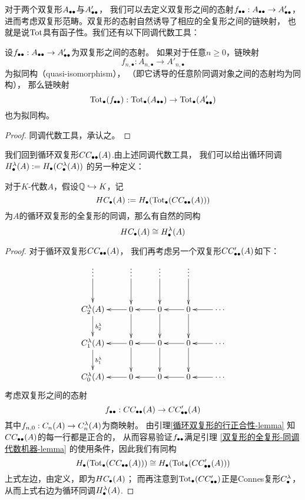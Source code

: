 对于两个双复形$A_{\bullet\bullet}$与$A'_{\bullet\bullet}$，
我们可以去定义双复形之间的态射$f_{\bullet\bullet}:A_{\bullet\bullet}\to A'_{\bullet\bullet}$，
进而考虑双复形范畴。双复形的态射自然诱导了相应的全复形之间的链映射，
也就是说$\operatorname{Tot}$具有函子性。我们还有以下同调代数工具：

\begin{lemma}设$f_{\bullet\bullet}:A_{\bullet\bullet}\to A'_{\bullet\bullet}$为双复形之间的态射。
如果对于任意$n\geq 0$，链映射
$$f_{n,\bullet}:A_{n,\bullet}\to A'_{n,\bullet}$$
为拟同构（quasi-isomorphism），
（即它诱导的任意阶同调对象之间的态射均为同构），
那么链映射
$$\operatorname{Tot}_{\bullet}(f_{\bullet\bullet}):
\operatorname{Tot}_{\bullet}(A_{\bullet\bullet})\to\operatorname{Tot}_{\bullet}(A'_{\bullet\bullet})$$
也为拟同构。
\label{双复形的全复形-同调代数机器-lemma}
\end{lemma}

\begin{proof}
同调代数工具，承认之。
\end{proof}

我们回到循环双复形$CC_{\bullet\bullet}(A)$.由上述同调代数工具，
我们可以给出循环同调
$H^{\lambda}_{\bullet}(A):=H_{\bullet}(C^{\lambda}_{\bullet}(A))$
的另一种定义：

\begin{thm}对于$K$-代数$A$，假设$\mathbb{Q}\hookrightarrow K$，记
$$HC_{\bullet}(A):=H_{\bullet}(\operatorname{Tot}_{\bullet}(CC_{\bullet\bullet}(A)))$$
为$A$的循环双复形的全复形的同调，那么有自然的同构
$$HC_{\bullet}(A)\cong H^{\lambda}_{\bullet}(A)$$
\end{thm}

\begin{proof}
对于循环双复形$CC_{\bullet\bullet}(A)$，
我们再考虑另一个双复形$CC'_{\bullet\bullet}(A)$如下：
$$\xymatrix{
   \vdots \ar[d]
  &\vdots \ar[d]
  &\vdots \ar[d]
  &\vdots \ar[d]
  &
\\
   C_2^{\lmd}(A)  \ar[d]^{b_2^{\lmd}}
  &0 \ar[d]  \ar[l]
  &0 \ar[d]  \ar[l]
  &0 \ar[d]  \ar[l]
  &\cdots    \ar[l]
\\
   C_1^{\lmd}(A)  \ar[d]^{b_1^{\lmd}}
  &0 \ar[d]  \ar[l]
  &0 \ar[d]  \ar[l]
  &0 \ar[d]  \ar[l]
  &\cdots    \ar[l]
\\
   C_0^{\lmd}(A)
  &0  \ar[l]
  &0  \ar[l]
  &0  \ar[l]
  &\cdots    \ar[l]
}$$
考虑双复形之间的态射
$$f_{\bullet\bullet}:CC_{\bullet\bullet}(A)\to CC'_{\bullet\bullet}(A)$$
其中$f_{n,0}:C_n(A)\to C_n^{\lambda}(A)$为商映射。
由引理\ref{循环双复形的行正合性-lemma}
知$CC_{\bullet\bullet}(A)$的每一行都是正合的，
从而容易验证$f_{\bullet\bullet}$满足引理
\ref{双复形的全复形-同调代数机器-lemma}
的使用条件，因此我们有同构
$$
H_{\bullet}(\operatorname{Tot}_{\bullet}(CC_{\bullet\bullet}(A)))\cong
H_{\bullet}(\operatorname{Tot}_{\bullet}(CC'_{\bullet\bullet}(A)))
$$
上式左边，由定义，即为$HC_{\bullet}(A)$；
而再注意到$\operatorname{Tot}_{\bullet}(CC'_{\bullet\bullet})$正是Connes复形$C^{\lambda}_{\bullet}$，
从而上式右边为循环同调$H^{\lambda}_{\bullet}(A)$.
\end{proof}


